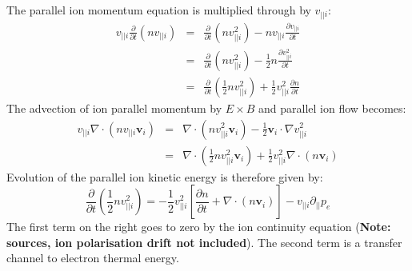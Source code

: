 \documentclass[12pt,a4paper]{article}
\begin{document}
The parallel ion momentum equation is multiplied through by $v_{||i}$:
\begin{eqnarray*}
v_{||i}\frac{\partial}{\partial t}\left(nv_{||i}\right) &=& \frac{\partial}{\partial t}\left(nv_{||i}^2\right) - nv_{||i}\frac{\partial v_{||i}}{\partial t} \\
&=& \frac{\partial}{\partial t}\left(nv_{||i}^2\right) - \frac{1}{2}n\frac{\partial v_{||i}^2}{\partial t} \\
&=& \frac{\partial}{\partial t}\left(\frac{1}{2}nv_{||i}^2\right) + \frac{1}{2}v_{||i}^2\frac{\partial n}{\partial t}
\end{eqnarray*}
The advection of ion parallel momentum by $E\times B$ and parallel ion flow becomes:
\begin{eqnarray*}
  v_{||i}\nabla\cdot\left(nv_{||i}\mathbf{v}_i\right) &=& \nabla\cdot\left(nv_{||i}^2\mathbf{v}_i\right) - \frac{1}{2}\mathbf{v}_i\cdot\nabla v_{||i}^2 \\
  &=& \nabla\cdot\left(\frac{1}{2}nv_{||i}^2 \mathbf{v}_i\right) + \frac{1}{2}v_{||i}^2\nabla\cdot\left(n\mathbf{v}_i\right)
\end{eqnarray*}
Evolution of the parallel ion kinetic energy is therefore given by:
\begin{equation}
  \frac{\partial}{\partial t}\left(\frac{1}{2}nv_{||i}^2\right) = -\frac{1}{2}v_{||i}^2\left[\frac{\partial n}{\partial t} + \nabla\cdot\left(n\mathbf{v}_i\right)\right] - v_{||i}\partial_{||}p_e
\end{equation}
The first term on the right goes to zero by the ion continuity equation ({\bf Note: sources, ion polarisation drift not included}). 
The second term is a transfer channel to electron thermal energy.
\end{document}
